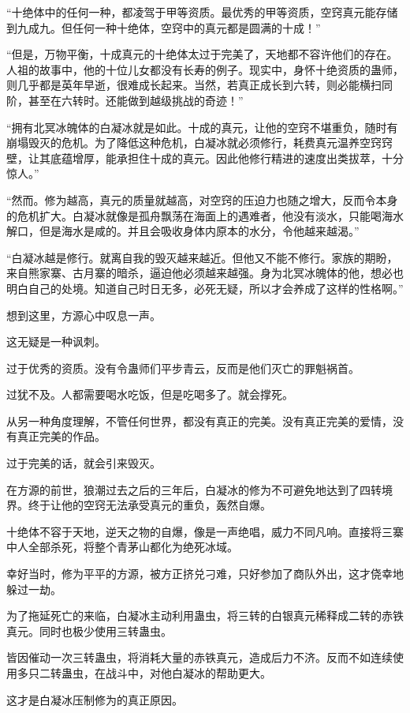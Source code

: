 \begin{this_body}
“十绝体中的任何一种，都凌驾于甲等资质。最优秀的甲等资质，空窍真元能存储到九成九。但任何一种十绝体，空窍中的真元都是圆满的十成！”

“但是，万物平衡，十成真元的十绝体太过于完美了，天地都不容许他们的存在。人祖的故事中，他的十位儿女都没有长寿的例子。现实中，身怀十绝资质的蛊师，则几乎都是英年早逝，很难成长起来。当然，若真正成长到六转，则必能横扫同阶，甚至在六转时。还能做到越级挑战的奇迹！”

“拥有北冥冰魄体的白凝冰就是如此。十成的真元，让他的空窍不堪重负，随时有崩塌毁灭的危机。为了降低这种危机，白凝冰就必须修行，耗费真元温养空窍窍壁，让其底蕴增厚，能承担住十成的真元。因此他修行精进的速度出类拔萃，十分惊人。”

“然而。修为越高，真元的质量就越高，对空窍的压迫力也随之增大，反而令本身的危机扩大。白凝冰就像是孤舟飘荡在海面上的遇难者，他没有淡水，只能喝海水解口，但是海水是咸的。并且会吸收身体内原本的水分，令他越来越渴。”

“白凝冰越是修行。就离自我的毁灭越来越近。但他又不能不修行。家族的期盼，来自熊家寨、古月寨的暗杀，逼迫他必须越来越强。身为北冥冰魄体的他，想必也明白自己的处境。知道自己时日无多，必死无疑，所以才会养成了这样的性格啊。”

想到这里，方源心中叹息一声。

这无疑是一种讽刺。

过于优秀的资质。没有令蛊师们平步青云，反而是他们灭亡的罪魁祸首。

过犹不及。人都需要喝水吃饭，但是吃喝多了。就会撑死。

从另一种角度理解，不管任何世界，都没有真正的完美。没有真正完美的爱情，没有真正完美的作品。

过于完美的话，就会引来毁灭。

在方源的前世，狼潮过去之后的三年后，白凝冰的修为不可避免地达到了四转境界。终于让他的空窍无法承受真元的重负，轰然自爆。

十绝体不容于天地，逆天之物的自爆，像是一声绝唱，威力不同凡响。直接将三寨中人全部杀死，将整个青茅山都化为绝死冰域。

幸好当时，修为平平的方源，被方正挤兑刁难，只好参加了商队外出，这才侥幸地躲过一劫。

为了拖延死亡的来临，白凝冰主动利用蛊虫，将三转的白银真元稀释成二转的赤铁真元。同时也极少使用三转蛊虫。

皆因催动一次三转蛊虫，将消耗大量的赤铁真元，造成后力不济。反而不如连续使用多只二转蛊虫，在战斗中，对他白凝冰的帮助更大。

这才是白凝冰压制修为的真正原因。


\end{this_body}
